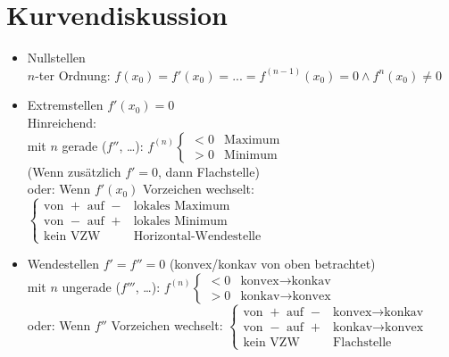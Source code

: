 \section{Kurvendiskussion}
\begin{itemize}
\item Nullstellen\\
$n$-ter Ordnung: $f(x_0) = f'(x_0)=...=f^{(n-1)}(x_0)=0 \wedge f^n (x_0) \not = 0$
\item Extremstellen $f'(x_0)=0$\\
Hinreichend: \\
mit $n$ gerade ($f''$, …): $f^{(n)}\begin{cases}
<0 & \text{Maximum}\\
>0 & \text{Minimum}
\end{cases}$\\
(Wenn zusätzlich $f'=0$, dann Flachstelle)\\
oder: Wenn $f'(x_0)$ Vorzeichen wechselt: $\begin{cases}
\text{von }+ \text{ auf }-&\text{lokales Maximum}\\
\text{von }- \text{ auf }+&\text{lokales Minimum}\\
\text{kein VZW} & \text{Horizontal-Wendestelle}
\end{cases}$
\item Wendestellen $f'=f''=0$ (konvex/konkav von oben betrachtet)\\
mit $n$ ungerade ($f'''$, …): $f^{(n)}\begin{cases}
<0 & \text{konvex}\to \text{konkav}\\
>0 & \text{konkav}\to \text{konvex}
\end{cases}$\\
oder: Wenn $f''$ Vorzeichen wechselt: $\begin{cases}
\text{von }+ \text{ auf }-&\text{konvex}\to \text{konkav}\\
\text{von }- \text{ auf }+&\text{konkav}\to \text{konvex}\\
\text{kein VZW} & \text{Flachstelle}
\end{cases}$
\end{itemize}

